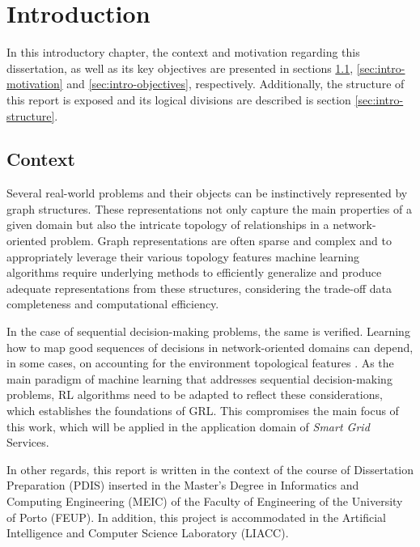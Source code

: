 
\chapter{Introduction} \label{chap:intro}

In this introductory chapter, the context and motivation regarding this dissertation, as well as its key objectives are presented in sections \ref{sec:intro-context}, \ref{sec:intro-motivation} and \ref{sec:intro-objectives}, respectively. Additionally, the structure of this report is exposed and its logical divisions are described is section \ref{sec:intro-structure}.

\section{Context} \label{sec:intro-context}

Several real-world problems and their objects can be instinctively represented by graph structures. These representations not only capture the main properties of a given domain but also the intricate topology of relationships in a network-oriented problem. Graph representations are often sparse and complex and to appropriately leverage their various topology features   machine learning algorithms require underlying methods to efficiently generalize and produce adequate representations from these structures, considering the trade-off data completeness and computational efficiency. \par
In the case of sequential decision-making problems, the same is verified. Learning how to map good sequences of decisions in network-oriented domains can depend, in some cases, on accounting for the environment topological features \cite{chenScalableGraphReinforcement2023, xingBilevelGraphReinforcement2023, xingGraphReinforcementLearningBased2023, zhaoGraphbasedDeepReinforcement2022b}. As the main paradigm of machine learning that addresses sequential decision-making problems, \ac{RL} algorithms need to be adapted to reflect these considerations, which establishes the foundations of \acf{GRL}. This compromises the main focus of this work, which will be applied in the application domain of \textit{Smart Grid} Services. \par
In other regards, this report is written in the context of the course of Dissertation Preparation (PDIS) inserted in the Master's Degree in Informatics and Computing Engineering (MEIC) of the Faculty of Engineering of the University of Porto (FEUP).  In addition, this project is accommodated in the Artificial Intelligence and Computer Science Laboratory (LIACC). \par



